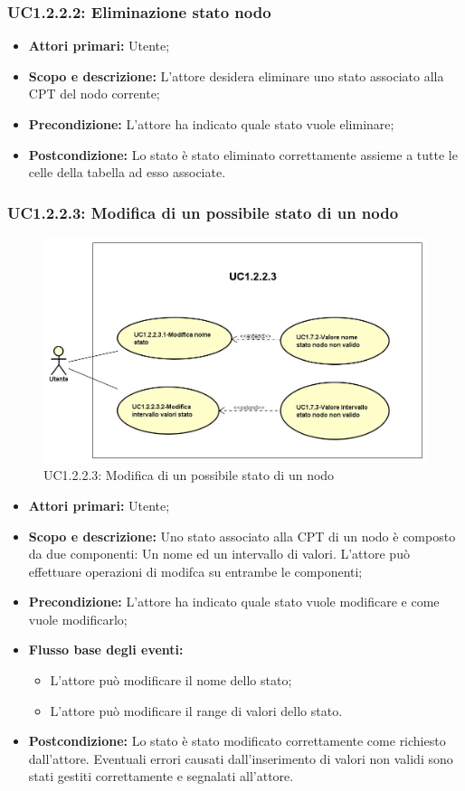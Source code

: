 \subsubsection{UC1.2.2.2: Eliminazione stato nodo} 
\begin{itemize} 
	\item{\textbf{Attori primari:} Utente;} 
	\item{\textbf{Scopo e descrizione:} L'attore desidera eliminare uno stato associato alla CPT del nodo corrente;} 
	\item{\textbf{Precondizione:} L'attore ha indicato quale stato vuole eliminare;} 
	\item{\textbf{Postcondizione:} Lo stato è stato eliminato correttamente assieme a tutte le celle della tabella ad esso associate.} 
\end{itemize} 
\subsubsection{UC1.2.2.3: Modifica di un possibile stato di un nodo} 
\begin{figure} [H]
	\centering
	\includegraphics[scale=0.45]{Img/UC1-2-2-3} 
	\caption{UC1.2.2.3: Modifica di un possibile stato di un nodo} \label{} 
\end{figure} 
\begin{itemize} 
	\item{\textbf{Attori primari:} Utente;} 
	\item{\textbf{Scopo e descrizione:} Uno stato associato alla CPT di un nodo è composto da due componenti: Un nome ed un intervallo di valori. L'attore può effettuare operazioni di modifca su entrambe le componenti;} 
	\item{\textbf{Precondizione:} L'attore ha indicato quale stato vuole modificare e come vuole modificarlo;} 
	\item{\textbf{Flusso base degli eventi:} 
		\begin{itemize} 
			\item{L'attore può modificare il nome dello stato;} 
			\item{L'attore può modificare il range di valori dello stato.} 
		\end{itemize} 			
	} 
	\item{\textbf{Postcondizione:} Lo stato è stato modificato correttamente come richiesto dall'attore. Eventuali errori causati dall'inserimento di valori non validi sono stati gestiti correttamente e segnalati all'attore.} 
\end{itemize} 
